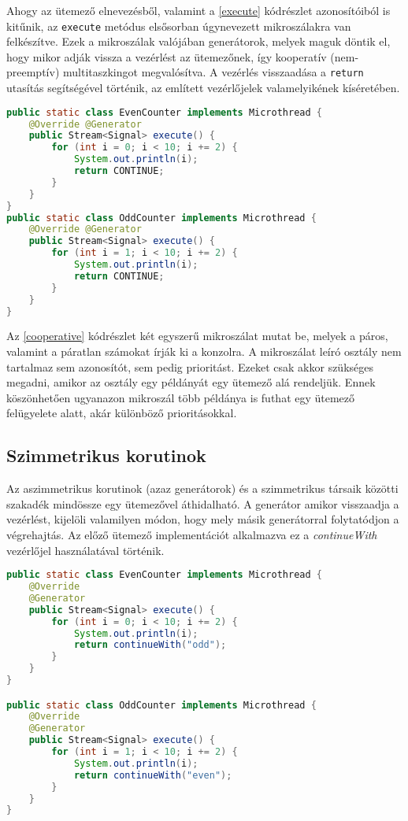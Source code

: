 Ahogy az ütemező elnevezésből, valamint a \ref{execute} kódrészlet azonosítóiból is kitűnik, az \texttt{execute} metódus elsősorban úgynevezett mikroszálakra van felkészítve. Ezek a mikroszálak valójában generátorok, melyek maguk döntik el, hogy mikor adják vissza a vezérlést az ütemezőnek, így kooperatív (nem-preemptív) multitaszkingot megvalósítva. A vezérlés visszaadása a \texttt{return} utasítás segítségével történik, az említett vezérlőjelek valamelyikének kíséretében.

\begin{lstlisting}[language=Java, caption={Kooperatív mikroszálak}, escapechar=!, captionpos=b, aboveskip=1em, label=cooperative]
public static class EvenCounter implements Microthread {
    @Override @Generator
    public Stream<Signal> execute() {
        for (int i = 0; i < 10; i += 2) {
            System.out.println(i);
            return CONTINUE;
        }
    }
}
public static class OddCounter implements Microthread {
    @Override @Generator
    public Stream<Signal> execute() {
        for (int i = 1; i < 10; i += 2) {
            System.out.println(i);
            return CONTINUE;
        }
    }
}
\end{lstlisting} 

Az \ref{cooperative} kódrészlet két egyszerű mikroszálat mutat be, melyek a páros, valamint a páratlan számokat írják ki a konzolra. A mikroszálat leíró osztály nem tartalmaz sem azonosítót, sem pedig prioritást. Ezeket csak akkor szükséges megadni, amikor az osztály egy példányát egy ütemező alá rendeljük. Ennek köszönhetően ugyanazon mikroszál több példánya is futhat egy ütemező felügyelete alatt, akár különböző prioritásokkal.

\subsection{Szimmetrikus korutinok}

Az aszimmetrikus korutinok (azaz generátorok) és a szimmetrikus társaik közötti szakadék mindössze egy ütemezővel áthidalható. A generátor amikor visszaadja a vezérlést, kijelöli valamilyen módon, hogy mely másik generátorral folytatódjon a végrehajtás. Az előző ütemező implementációt alkalmazva ez a \textit{continueWith} vezérlőjel használatával történik.

\begin{lstlisting}[language=Java, caption={Számlálás szimmetrikus korutinokkal}, escapechar=!, captionpos=b, aboveskip=1em, label=symmetric]
public static class EvenCounter implements Microthread {
    @Override
    @Generator
    public Stream<Signal> execute() {
        for (int i = 0; i < 10; i += 2) {
            System.out.println(i);
            return continueWith("odd");
        }
    }
}

public static class OddCounter implements Microthread {
    @Override
    @Generator
    public Stream<Signal> execute() {
        for (int i = 1; i < 10; i += 2) {
            System.out.println(i);
            return continueWith("even");
        }
    }
}
\end{lstlisting} 

